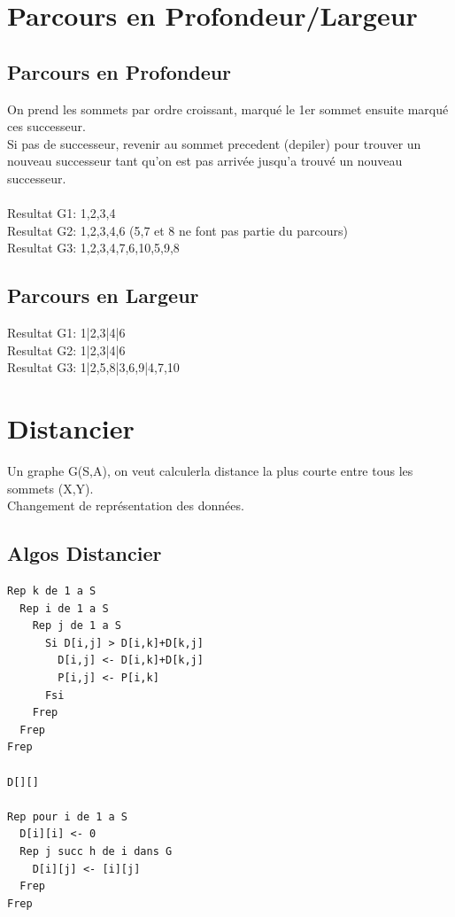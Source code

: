 \documentclass[a4paper,12pt,openany]{book}
\begin{document}
\chapter{Parcours en Profondeur/Largeur}

\section {Parcours en Profondeur}

On prend les sommets par ordre croissant, marqué le 1er sommet  ensuite marqué ces successeur.\\
Si pas de successeur, revenir au sommet precedent (depiler) pour trouver un nouveau successeur tant qu'on est pas arrivée jusqu'a trouvé un nouveau successeur.\\
\\
Resultat G1: 1,2,3,4 \\
Resultat G2: 1,2,3,4,6 (5,7 et 8 ne font pas partie du parcours) \\
Resultat G3: 1,2,3,4,7,6,10,5,9,8 \\


\section {Parcours en Largeur}

Resultat G1: 1|2,3|4|6 \\
Resultat G2: 1|2,3|4|6 \\
Resultat G3: 1|2,5,8|3,6,9|4,7,10 \\




\chapter{Distancier}

Un graphe G(S,A), on veut calculerla distance la plus courte entre tous les sommets (X,Y).\\
Changement de représentation des données.\\


\section{Algos Distancier}
\begin{verbatim}
Rep k de 1 a S
  Rep i de 1 a S
    Rep j de 1 a S
      Si D[i,j] > D[i,k]+D[k,j]
        D[i,j] <- D[i,k]+D[k,j]
        P[i,j] <- P[i,k]
      Fsi
    Frep
  Frep
Frep

D[][]

Rep pour i de 1 a S
  D[i][i] <- 0
  Rep j succ h de i dans G
    D[i][j] <- [i][j]
  Frep
Frep
\end{verbatim}
\\
\end{document}
